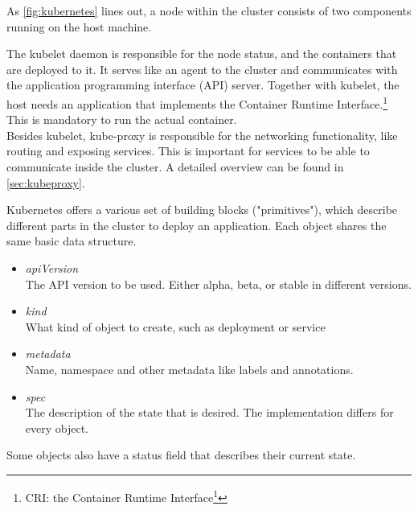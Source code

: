 As \autoref{fig:kubernetes} lines out, a node within the cluster consists of two components running on the host machine.

The kubelet daemon is responsible for the node status, and the containers that are deployed to it.
It serves like an agent to the cluster and communicates with the application programming interface (API) server.
Together with kubelet, the host needs an application that implements the Container Runtime Interface.\footnote{CRI: the Container Runtime Interface\footcite{CRI}}
This is mandatory to run the actual container.
\\
Besides kubelet, kube-proxy is responsible for the networking functionality, like routing and exposing services.
This is important for services to be able to communicate inside the cluster.
A detailed overview can be found in \autoref{sec:kubeproxy}.\cite{KUBERNETES-COMPONENTS}
\\
\newpage

Kubernetes offers a various set of building blocks ("primitives"), which describe different parts in the cluster to deploy an application.
Each object shares the same basic data structure.

\begin{itemize}
    \item \textit{apiVersion} \\
    The API version to be used.
    Either alpha, beta, or stable in different versions.
    \item \textit{kind} \\
    What kind of object to create, such as deployment or service
    \item \textit{metadata} \\
    Name, namespace and other metadata like labels and annotations.
    \item \textit{spec} \\
    The description of the state that is desired.
    The implementation differs for every object.
\end{itemize}

Some objects also have a status field that describes their current state.~\cite{KUBERNETES-OBJECTS}

